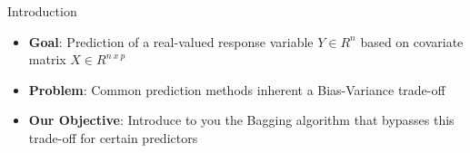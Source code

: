 \documentclass{beamer}
\begin{document}










\begin{frame}{Introduction}
\begin{itemize}
\item \textbf{Goal}: Prediction of a real-valued response variable $Y\in R^{n}$ based on covariate matrix $X\in R^{n\:x\:p}$
\item \textbf{Problem}: Common prediction methods inherent a Bias-Variance trade-off
% 
% 
% 
\item \textbf{Our Objective}: Introduce to you the Bagging algorithm that bypasses this trade-off for certain predictors
% 
% 
\end{itemize}
\end{frame}
\end{document}
